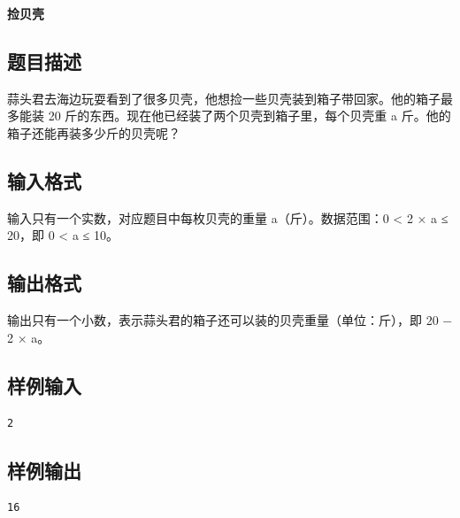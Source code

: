 \documentclass{article}
\newcommand{\problemname}[1]{\begin{center}\Large\bfseries #1\end{center}}
\begin{document}
\problemname{捡贝壳}

\subsection*{题目描述}
蒜头君去海边玩耍看到了很多贝壳，他想捡一些贝壳装到箱子带回家。他的箱子最多能装 20 斤的东西。现在他已经装了两个贝壳到箱子里，每个贝壳重 a 斤。他的箱子还能再装多少斤的贝壳呢？

\subsection*{输入格式}
输入只有一个实数，对应题目中每枚贝壳的重量 a（斤）。数据范围：0 < 2 × a ≤ 20，即 0 < a ≤ 10。

\subsection*{输出格式}
输出只有一个小数，表示蒜头君的箱子还可以装的贝壳重量（单位：斤），即 20 − 2 × a。

\subsection*{样例输入}
\begin{verbatim}
2
\end{verbatim}

\subsection*{样例输出}
\begin{verbatim}
16
\end{verbatim}
\end{document}
